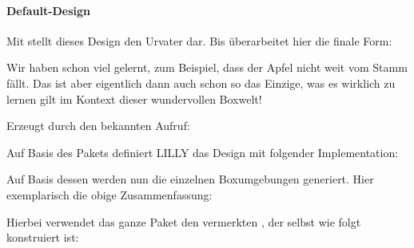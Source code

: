 \paragraph{Default-Design}
Mit  stellt dieses Design den Urvater dar. Bis  überarbeitet hier die finale Form: \begin{center}
    
    \begin{zusammenfassung}
        Wir haben schon viel gelernt, zum Beispiel, dass der Apfel nicht weit vom Stamm fällt. Das ist aber eigentlich dann auch schon so das Einzige, was es wirklich zu lernen gilt im Kontext dieser wundervollen Boxwelt!
    \end{zusammenfassung}
\end{center}
Erzeugt durch den bekannten Aufruf:
\begin{latex}
\begin{zusammenfassung}
\end{zusammenfassung}
\end{latex}
Auf Basis des Pakets  definiert LILLY das Design  mit folgender Implementation:
\begin{latex}
\end{latex}
Auf Basis dessen werden nun die einzelnen Boxumgebungen generiert. Hier exemplarisch die obige Zusammenfassung:
Hierbei verwendet das ganze Paket den vermerkten , der selbst wie folgt konstruiert ist:


